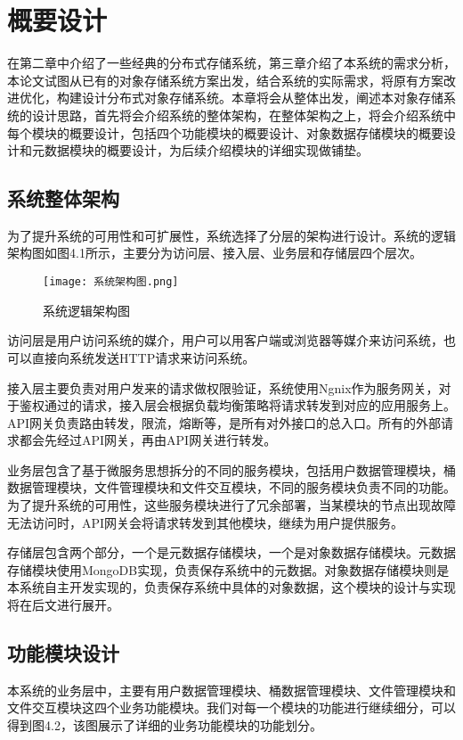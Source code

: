 
\chapter{概要设计}
在第二章中介绍了一些经典的分布式存储系统，第三章介绍了本系统的需求分析，本论文试图从已有的对象存储系统方案出发，结合系统的实际需求，将原有方案改进优化，构建设计分布式对象存储系统。本章将会从整体出发，阐述本对象存储系统的设计思路，首先将会介绍系统的整体架构，在整体架构之上，将会介绍系统中每个模块的概要设计，包括四个功能模块的概要设计、对象数据存储模块的概要设计和元数据模块的概要设计，为后续介绍模块的详细实现做铺垫。

\section{系统整体架构}%
为了提升系统的可用性和可扩展性，系统选择了分层的架构进行设计。系统的逻辑架构图如图4.1所示，主要分为访问层、接入层、业务层和存储层四个层次。

\begin{figure}[h]
  \centering
  \texttt{[image: 系统架构图.png]}
  \caption{系统逻辑架构图}
\end{figure}

访问层是用户访问系统的媒介，用户可以用客户端或浏览器等媒介来访问系统，也可以直接向系统发送HTTP请求来访问系统。

接入层主要负责对用户发来的请求做权限验证，系统使用Ngnix作为服务网关，对于鉴权通过的请求，接入层会根据负载均衡策略将请求转发到对应的应用服务上。API网关负责路由转发，限流，熔断等，是所有对外接口的总入口。所有的外部请求都会先经过API网关，再由API网关进行转发。

业务层包含了基于微服务思想拆分的不同的服务模块，包括用户数据管理模块，桶数据管理模块，文件管理模块和文件交互模块，不同的服务模块负责不同的功能。为了提升系统的可用性，这些服务模块进行了冗余部署，当某模块的节点出现故障无法访问时，API网关会将请求转发到其他模块，继续为用户提供服务。

存储层包含两个部分，一个是元数据存储模块，一个是对象数据存储模块。元数据存储模块使用MongoDB实现，负责保存系统中的元数据。对象数据存储模块则是本系统自主开发实现的，负责保存系统中具体的对象数据，这个模块的设计与实现将在后文进行展开。

\section{功能模块设计}
本系统的业务层中，主要有用户数据管理模块、桶数据管理模块、文件管理模块和文件交互模块这四个业务功能模块。我们对每一个模块的功能进行继续细分，可以得到图4.2，该图展示了详细的业务功能模块的功能划分。

